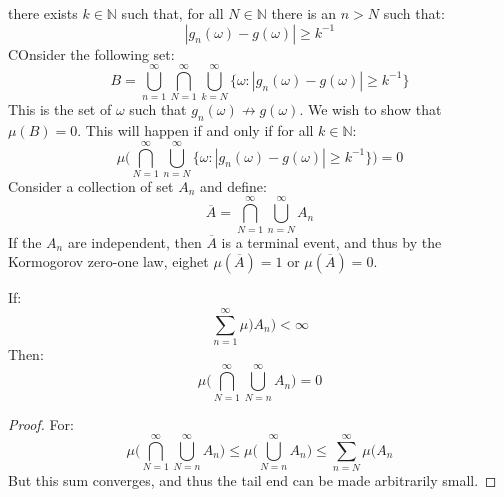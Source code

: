             there exists $k\in\mathbb{N}$ such that, for all
            $N\in\mathbb{N}$ there is an $n>N$ such that:
            \begin{equation}
                |g_{n}(\omega)-g(\omega)|\geq{k}^{\minus{1}}
            \end{equation}
            COnsider the following set:
            \begin{equation}
                B=\bigcup_{n=1}^{\infty}\bigcap_{N=1}^{\infty}
                    \bigcup_{k=N}^{\infty}\big\{\omega:
                    |g_{n}(\omega)-g(\omega)|\geq{k}^{\minus{1}}\big\}
            \end{equation}
            This is the set of $\omega$ such that
            $g_{n}(\omega)\not\rightarrow{g}(\omega)$. We wish to show
            that $\mu(B)=0$. This will happen if and only if for all
            $k\in\mathbb{N}$:
            \begin{equation}
                \mu\Big(\bigcap_{N=1}^{\infty}\bigcup_{n=N}^{\infty}
                    \big\{\omega:|g_{n}(\omega)-g(\omega)|
                    \geq{k}^{\minus{1}}\big\}\Big)=0
            \end{equation}
            Consider a collection of set $A_{n}$ and define:
            \begin{equation}
                \overline{A}=\bigcap_{N=1}^{\infty}
                    \bigcup_{n=N}^{\infty}A_{n}
            \end{equation}
            If the $A_{n}$ are independent, then $\overline{A}$ is
            a terminal event, and thus by the Kormogorov zero-one law,
            eighet $\mu(\overline{A})=1$ or $\mu(\overline{A})=0$.
            \begin{theorem}
                If:
                \begin{equation}
                    \sum_{n=1}^{\infty}\mu)A_{n})<\infty
                \end{equation}
                Then:
                \begin{equation}
                    \mu\Big(\bigcap_{N=1}^{\infty}
                        \bigcup_{N=n}^{\infty}A_{n}\Big)=0
                \end{equation}
            \end{theorem}
            \begin{proof}
                For:
                \begin{equation}
                    \mu\Big(\bigcap_{N=1}^{\infty}
                        \bigcup_{N=n}^{\infty}A_{n}\Big)
                    \leq\mu\Big(\bigcup_{N=n}^{\infty}A_{n}\Big)
                    \leq\sum_{n=N}^{\infty}\mu(A_{n}
                \end{equation}
                But this sum converges, and thus the tail end can
                be made arbitrarily small.
            \end{proof}
